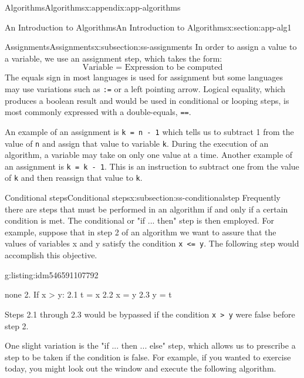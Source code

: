 \documentclass[oneside,10pt,]{book}
\newcommand{\mono}[1]{\texttt{#1}}
\numberwithin{equation}{section}
\begin{document}
\begin{appendixptx}{Algorithms}{}{Algorithms}{}{}{x:appendix:app-algorithms}
\begin{sectionptx}{An Introduction to Algorithms}{}{An Introduction to Algorithms}{}{}{x:section:app-alg1}
\typeout{************************************************}
%
\begin{subsectionptx}{Assignments}{}{Assignments}{}{}{x:subsection:ss-assignments}
In order to assign a value to a variable, we use an assignment step, which takes the form:%
\begin{equation*}
\textrm{Variable = Expression to be computed}
\end{equation*}
The equals sign in most languages is used for assignment but some languages may use variations such as \mono{:=} or a left pointing arrow. Logical equality, which produces a boolean result and would be used in conditional or looping steps, is most commonly expressed with a double-equals, \mono{==}.%
\par
An example of an  assignment is \mono{k = n - 1} which tells us to subtract 1 from the value of \mono{n} and assign that value to variable \mono{k}. During the execution of an algorithm, a variable may take on only one value at a time. Another example of an assignment is \mono{k = k - 1}. This is an instruction to subtract one from the value of \mono{k} and then reassign that value to \mono{k}.%
\end{subsectionptx}
%
%
\typeout{************************************************}
\typeout{************************************************}
%
\begin{subsectionptx}{Conditional steps}{}{Conditional steps}{}{}{x:subsection:ss-conditionalstep}
Frequently there are steps that must be performed in an algorithm if and only if a certain condition is met. The conditional or "if ... then" step is then employed. For example, suppose that in step 2 of an algorithm we want to assure that the values of variables x and y satisfy the condition \mono{x <= y}. The following step would accomplish this objective.%
\begin{listingptx}{}{g:listing:idm546591107792}{}%
\begin{program}{none}
2. If x > y:
	2.1 t = x
	2.2 x = y
	2.3 y = t
\end{program}
\tcblower
\end{listingptx}%
Steps 2.1 through 2.3 would be bypassed if the condition \mono{x > y} were false before step 2.%
\par
One slight variation is the "if ... then ... else" step, which allows us to prescribe a step to be taken if the condition is false. For example, if you wanted to exercise today, you might look out the window and execute the following algorithm.%

\end{subsectionptx}
\end{sectionptx}
\end{appendixptx}
\end{document}
